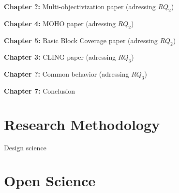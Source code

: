 \textbf{Chapter ?: } Multi-objectivization paper (adressing $RQ_2$)

\textbf{Chapter 4: } MOHO paper (adressing $RQ_2$)

\textbf{Chapter 5: } Basic Block Coverage paper (adressing $RQ_2$)

\textbf{Chapter 3: } CLING paper (adressing $RQ_3$)

\textbf{Chapter ?: } Common behavior (adressing $RQ_3$)

\textbf{Chapter 7: } Conclusion


\section{Research Methodology}

Design science \cite{Hevner2004}

\section{Open Science}













